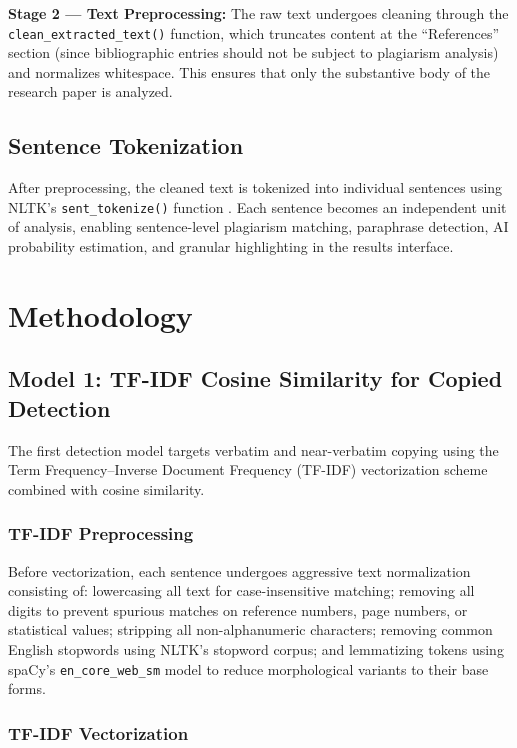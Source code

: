 \documentclass[conference]{IEEEtran}
\begin{document}
\textbf{Stage 2 --- Text Preprocessing:} The raw text undergoes cleaning through the \texttt{clean\_extracted\_text()} function, which truncates content at the ``References'' section (since bibliographic entries should not be subject to plagiarism analysis) and normalizes whitespace. This ensures that only the substantive body of the research paper is analyzed.

\subsection{Sentence Tokenization}

After preprocessing, the cleaned text is tokenized into individual sentences using NLTK's \texttt{sent\_tokenize()} function \cite{b29}. Each sentence becomes an independent unit of analysis, enabling sentence-level plagiarism matching, paraphrase detection, AI probability estimation, and granular highlighting in the results interface.

\section{Methodology}

\subsection{Model 1: TF-IDF Cosine Similarity for Copied Detection}

The first detection model targets verbatim and near-verbatim copying using the Term Frequency--Inverse Document Frequency (TF-IDF) vectorization scheme combined with cosine similarity.

\subsubsection{TF-IDF Preprocessing}

Before vectorization, each sentence undergoes aggressive text normalization consisting of: lowercasing all text for case-insensitive matching; removing all digits to prevent spurious matches on reference numbers, page numbers, or statistical values; stripping all non-alphanumeric characters; removing common English stopwords using NLTK's stopword corpus; and lemmatizing tokens using spaCy's \texttt{en\_core\_web\_sm} model to reduce morphological variants to their base forms.

\subsubsection{TF-IDF Vectorization}
\end{document}

